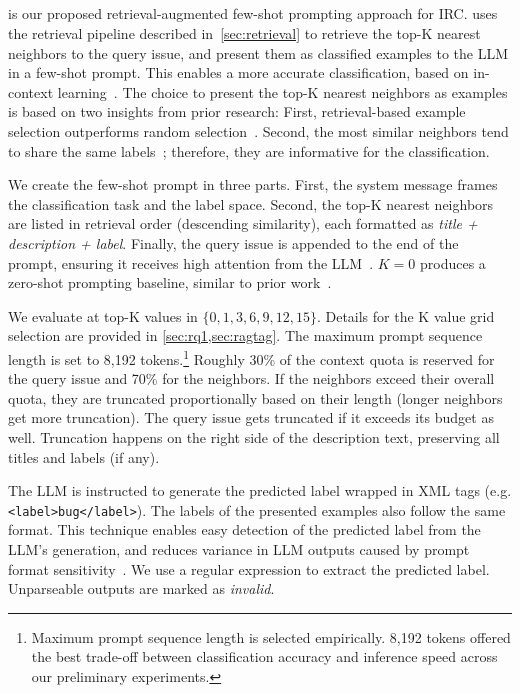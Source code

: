 \subsection{\ragtag}
\label{sec:approach-ragtag}
\ragtag is our proposed retrieval-augmented few-shot prompting approach for
IRC. \ragtag uses the retrieval pipeline described in~\cref{sec:retrieval}
to retrieve the top-K nearest neighbors to the query issue, and present
them as classified examples to the LLM in a few-shot prompt. This enables
a more accurate classification, based on in-context
learning~\cite{brown2020language}. The choice to present the top-K nearest
neighbors as examples is based on two insights from prior research: First,
retrieval-based example selection outperforms random
selection~\cite{liu2022makes}. Second, the most similar neighbors tend to
share the same labels~\cite{cover1967nearest}; therefore, they are
informative for the classification.

We create the few-shot prompt in three parts. First, the system message frames the classification task and the label space. Second, the top-K nearest neighbors are listed in retrieval order (descending similarity), each formatted as \textit{title + description + label}. Finally, the query issue is appended to the end of the prompt, ensuring it receives high attention from the LLM~\cite{liu2024lost}. $K=0$ produces a zero-shot prompting baseline, similar to prior work~\cite{colavito2025benchmarking}.

We evaluate \ragtag at top-K values in $\{0, 1, 3, 6, 9, 12, 15\}$. Details
for the K value grid selection are provided in \cref{sec:rq1,sec:ragtag}. The maximum prompt sequence length is set to 8,192 tokens.\footnote{Maximum prompt sequence length is selected empirically. 8,192 tokens offered the best trade-off between classification accuracy and inference speed across our preliminary experiments.} Roughly 30\% of the
context quota is reserved for the query issue and 70\% for the
neighbors. If the neighbors exceed their overall quota, they are
truncated proportionally based on their length (longer neighbors get
more truncation). The query issue gets truncated if it exceeds its
budget as well. Truncation happens on the right side of the
description text, preserving all titles and labels (if any).


The LLM is instructed to generate the predicted label wrapped in XML tags (e.g. \texttt{<label>bug</label>}). The labels of the presented examples also follow the same format. This technique enables easy detection of the predicted label from the LLM's generation, and reduces variance in LLM outputs caused by prompt format sensitivity~\cite{sclar2023quantifying}. We use a regular expression to extract the predicted label. Unparseable outputs are marked as \textit{invalid}.

